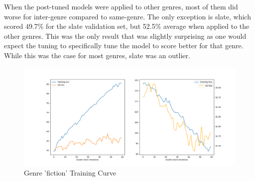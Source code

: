 \documentclass[a4paper,10pt]{article}
\begin{document}
\par
\justify
When the post-tuned models were applied to other genres, most of them did worse for inter-genre compared to same-genre. The only exception is slate, which scored 49.7\% for the slate validation set, but 52.5\% average when applied to the other genres. This was the only result that was slightly surprising as one would expect the tuning to specifically tune the model to score better for that genre. While this was the case for most genres, slate was an outlier.

\begin{figure}[h]
    \centering
    \includegraphics[scale=0.4]{fiction}
    \caption{Genre 'fiction' Training Curve}
    \label{fig:fictioncurve}
\end{figure}

\medskip


\end{document}
